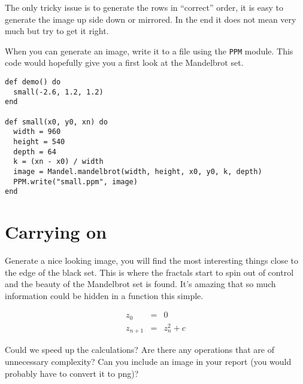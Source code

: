\documentclass[a4paper,11pt]{article}
\begin{document}
The only tricky issue is to generate the rows in ``correct'' order, it
is easy to generate the image up side down or mirrored. In the end it
does not mean very much but try to get it right.

When you can generate an image, write it to a file using the {\tt PPM}
module. This code would hopefully give you a first look at the Mandelbrot set.

\begin{verbatim}
def demo() do
  small(-2.6, 1.2, 1.2)
end

def small(x0, y0, xn) do
  width = 960
  height = 540
  depth = 64
  k = (xn - x0) / width
  image = Mandel.mandelbrot(width, height, x0, y0, k, depth)
  PPM.write("small.ppm", image)
end
\end{verbatim}



\section{Carrying on}

Generate a nice looking image, you will find the most interesting
things close to the edge of the black set. This is where the fractals
start to spin out of control and the beauty of the Mandelbrot set is
found. It's amazing that so much information could be hidden in a
function this simple.

\begin{eqnarray*}
    z_0 &= &0 \\ 
    z_{n+1} & = &z_n^2 + c
\end{eqnarray*}

Could we speed up the calculations? Are there any operations that are
of unnecessary complexity? Can you include an image in your report
(you would probably have to convert it to png)?
\end{document}

